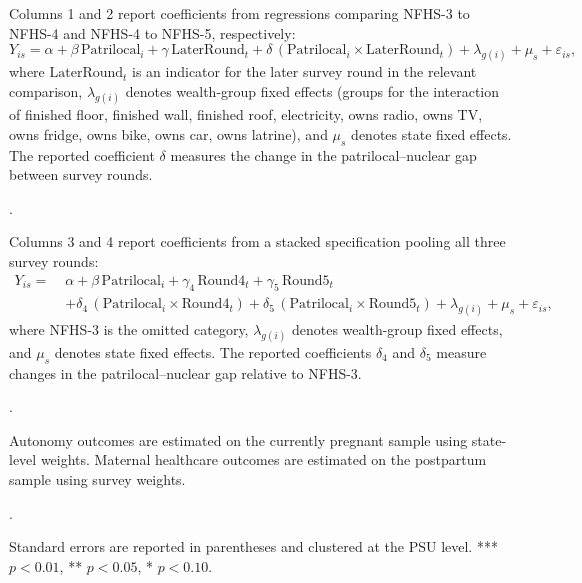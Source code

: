 \documentclass[12pt]{article}
\begin{document}
\begin{table}[!htbp]
    \centering
    \begin{threeparttable}[t]
        \caption{: Changes in the patrilocal--nuclear gap in women's autonomy and maternal healthcare utilization across NFHS rounds}
        \label{tab:proppatrilocal}

        \scriptsize
        \setlength{\tabcolsep}{6pt}
        \renewcommand{\arraystretch}{1.6}

        

        \begin{tablenotes}

\item Columns 1 and 2 report coefficients from regressions comparing NFHS-3 to NFHS-4 and NFHS-4 to NFHS-5, respectively: 
\[
Y_{is} = \alpha + \beta \,\text{Patrilocal}_i + \gamma \,\text{LaterRound}_t
+ \delta \,(\text{Patrilocal}_i \times \text{LaterRound}_t)
+ \lambda_{g(i)} + \mu_s + \varepsilon_{is},
\]
where $\text{LaterRound}_t$ is an indicator for the later survey round in the relevant comparison, $\lambda_{g(i)}$ denotes wealth-group fixed effects (groups for the interaction of finished floor, finished wall, finished roof, electricity, owns radio, owns TV, owns fridge, owns bike, owns car, owns latrine), and $\mu_s$ denotes state fixed effects. The reported coefficient $\delta$ measures the change in the patrilocal--nuclear gap between survey rounds.
\item . 
\item Columns 3 and 4 report coefficients from a stacked specification pooling all three survey rounds:
\[
\begin{aligned}
Y_{is} =\;& \alpha 
+ \beta \,\text{Patrilocal}_i
+ \gamma_4 \,\text{Round4}_t
+ \gamma_5 \,\text{Round5}_t \\
&+ \delta_4 \,(\text{Patrilocal}_i \times \text{Round4}_t)
+ \delta_5 \,(\text{Patrilocal}_i \times \text{Round5}_t)
+ \lambda_{g(i)} + \mu_s + \varepsilon_{is},
\end{aligned}
\]
where NFHS-3 is the omitted category, $\lambda_{g(i)}$ denotes wealth-group fixed effects, and $\mu_s$ denotes state fixed effects. The reported coefficients $\delta_4$ and $\delta_5$ measure changes in the patrilocal--nuclear gap relative to NFHS-3.
\item .
\item Autonomy outcomes are estimated on the currently pregnant sample using state-level weights. Maternal healthcare outcomes are estimated on the postpartum sample using survey weights.
\item .
\item Standard errors are reported in parentheses and clustered at the PSU level. *** $p<0.01$, ** $p<0.05$, * $p<0.10$.

        \end{tablenotes}
    \end{threeparttable}
\end{table}
\end{document}
